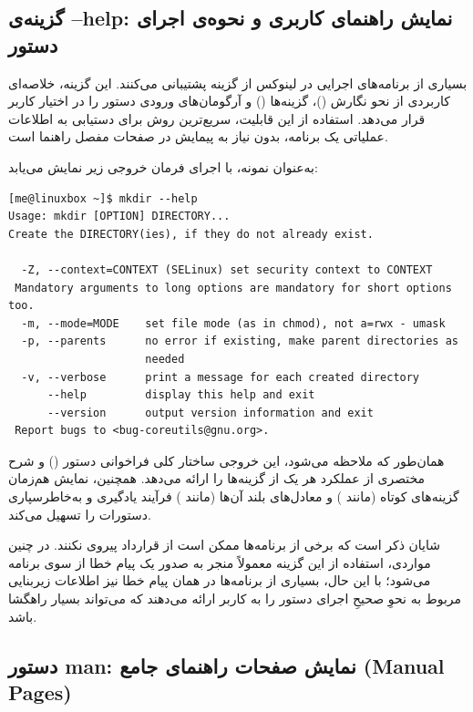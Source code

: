 \subsection{گزینه‌ی --help: نمایش راهنمای کاربری و نحوه‌ی اجرای دستور}

بسیاری از برنامه‌های اجرایی در لینوکس از گزینه  پشتیبانی می‌کنند. این گزینه، خلاصه‌ای کاربردی از نحو نگارش ()، گزینه‌ها () و آرگومان‌های ورودی دستور را در اختیار کاربر قرار می‌دهد. استفاده از این قابلیت، سریع‌ترین روش برای دستیابی به اطلاعات عملیاتی یک برنامه، بدون نیاز به پیمایش در صفحات مفصل راهنما است.

به‌عنوان نمونه، با اجرای فرمان  خروجی زیر نمایش می‌یابد:

\begin{latin}
\begin{lstlisting}
[me@linuxbox ~]$ mkdir --help
Usage: mkdir [OPTION] DIRECTORY...
Create the DIRECTORY(ies), if they do not already exist.

  -Z, --context=CONTEXT (SELinux) set security context to CONTEXT
 Mandatory arguments to long options are mandatory for short options too.
  -m, --mode=MODE    set file mode (as in chmod), not a=rwx - umask
  -p, --parents      no error if existing, make parent directories as
                     needed
  -v, --verbose      print a message for each created directory
      --help         display this help and exit
      --version      output version information and exit
 Report bugs to <bug-coreutils@gnu.org>.
\end{lstlisting}
\end{latin}

همان‌طور که ملاحظه می‌شود، این خروجی ساختار کلی فراخوانی دستور () و شرح مختصری از عملکرد هر یک از گزینه‌ها را ارائه می‌دهد. همچنین، نمایش هم‌زمان گزینه‌های کوتاه (مانند ) و معادل‌های بلند آن‌ها (مانند ) فرآیند یادگیری و به‌خاطرسپاری دستورات را تسهیل می‌کند.

شایان ذکر است که برخی از برنامه‌ها ممکن است از قرارداد  پیروی نکنند. در چنین مواردی، استفاده از این گزینه معمولاً منجر به صدور یک پیام خطا از سوی برنامه می‌شود؛ با این حال، بسیاری از برنامه‌ها در همان پیام خطا نیز اطلاعات زیربنایی مربوط به نحوِ صحیحِ اجرای دستور را به کاربر ارائه می‌دهند که می‌تواند بسیار راهگشا باشد.

\subsection{دستور man: نمایش صفحات راهنمای جامع (Manual Pages)}

